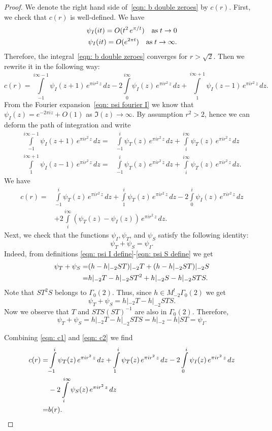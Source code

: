 \begin{proof}
We denote the right hand side of~\eqref{eqn: b double zeroes} by $c(r)$. First, we check that $c(r)$ is well-defined. We have
\begin{align}
\psi_I(it)=O(t^{2}\,e^{\pi/t})\quad\mbox{as}\;t\to 0\notag\\
  \psi_I(it)=O(e^{2\pi t})\quad\mbox{as}\;t\to\infty.\notag
\end{align}
Therefore, the integral~\eqref{eqn: b double zeroes} converges for $r>\sqrt{2}$.
Then we rewrite it in the following way:
$$c(r)=\int\limits_{-1}^{i\infty-1}\psi_I(z+1)\,e^{\pi i r^2 \,z}\,dz-2\int\limits_{0}^{i\infty}\psi_I(z)\,e^{\pi i r^2 \,z}\,dz+
\int\limits_{1}^{i\infty+1}\psi_I(z-1)\,e^{\pi i r^2 \,z}\,dz.$$
From the Fourier expansion~\eqref{eqn: psi fourier I} we know that $\psi_I(z)=e^{-2\pi i z}+O(1)$ as $\Im(z)\to\infty$.
By assumption $r^2>2$, hence we can deform the path of integration and write
\begin{align}\label{eqn: inside proof 1}
\int\limits_{-1}^{i\infty-1}\psi_I(z+1)\,e^{\pi i r^2 \,z}\,dz=&
\int\limits_{-1}^{i}\psi_T(z)\,e^{\pi i r^2 \,z}\,dz+\int\limits_{i}^{i\infty}\psi_T(z)\,e^{\pi i r^2 \,z}\,dz\\
\int\limits_{1}^{i\infty+1}\psi_I(z-1)\,e^{\pi i r^2 \,z}\,dz=&
\int\limits_{-1}^{i}\psi_T(z)\,e^{\pi i r^2 \,z}\,dz+\int\limits_{i}^{i\infty}\psi_T(z)\,e^{\pi i r^2 \,z}\,dz.
\end{align}
We have
\begin{align}\label{eqn: c1}c(r)=&\int\limits_{-1}^{i}\psi_T(z)\,e^{\pi i r^2 \,z}\,dz+\int\limits_{1}^{i}\psi_T(z)\,e^{\pi i r^2 \,z}\,dz
-2\int\limits_{0}^{i}\psi_I(z)\,e^{\pi i r^2 \,z}\,dz\\
&+2\int\limits_{i}^{i\infty}(\psi_T(z)-\psi_I(z))\,e^{\pi i r^2 \,z}\,dz.\nonumber
  \end{align}
Next, we check that the functions $\psi_I,\psi_T$, and $\psi_S$ satisfy the following identity:
\begin{equation}\label{eqn: c2}\psi_T+\psi_S=\psi_I.\end{equation}
Indeed, from definitions \eqref{eqn: psi I define}-\eqref{eqn: psi S define} we get
\begin{align}\psi_T+\psi_S=&(h-h|_{-2}ST)|_{-2}T+(h-h|_{-2}ST)|_{-2}S\notag\\
=&h|_{-2}T-h|_{-2}ST^2+h|_{-2}S-h|_{-2}STS.\notag\end{align}
Note that $ST^2S$ belongs to $\Gamma_0(2)$. Thus, since $h\in M^!_{-2}\Gamma_0(2)$ we get
$$\psi_T+\psi_S=h|_{-2}T-h|_{-2}STS. $$
Now we observe that $T$ and $STS(ST)^{-1}$ are also in $\Gamma_0(2)$. Therefore,
$$\psi_T+\psi_S=h|_{-2}T-h|_{-2}STS=h|_{-2}-h|ST=\psi_I.$$

Combining \eqref{eqn: c1} and \eqref{eqn: c2} we find
\begin{align}c(r)=&\int\limits_{-1}^{i}\psi_T(z)\,e^{\pi i r^2 \,z}\,dz+\int\limits_{1}^{i}\psi_T(z)\,e^{\pi i r^2 \,z}\,dz
-2\int\limits_{0}^{i}\psi_I(z)\,e^{\pi i r^2 \,z}\,dz\notag\\
&-2\int\limits_{i}^{i\infty}\psi_S(z)\,e^{\pi i r^2 \,z}\,dz\notag\\
=&b(r).\notag
  \end{align}
\end{proof}
